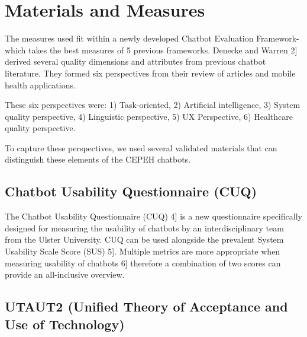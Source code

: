 \documentclass[a4paper, nobind]{templates/ociamthesis}
\begin{document}
\hypertarget{materials-and-measures}{%
\section{Materials and Measures}\label{materials-and-measures}}

The measures used fit within a newly developed Chatbot Evaluation Framework- which takes the best measures of 5 previous frameworks.
Denecke and Warren \hspace{0pt}{[}2{]}\hspace{0pt} derived several quality dimensions and attributes from previous chatbot literature.
They formed six perspectives from their review of articles and mobile health applications.

These six perspectives were: 1) Task-oriented, 2) Artificial intelligence, 3) System quality perspective, 4) Linguistic perspective, 5) UX Perspective, 6) Healthcare quality perspective.

To capture these perspectives, we used several validated materials that can distinguish these elements of the CEPEH chatbots.

\hypertarget{chatbot-usability-questionnaire-cuq}{%
\subsection{Chatbot Usability Questionnaire (CUQ)}\label{chatbot-usability-questionnaire-cuq}}

The Chatbot Usability Questionnaire (CUQ) \hspace{0pt}{[}4{]}\hspace{0pt} is a new questionnaire specifically designed for measuring the usability of chatbots by an interdisciplinary team from the Ulster University.
CUQ can be used alongside the prevalent System Usability Scale Score (SUS) \hspace{0pt}{[}5{]}\hspace{0pt}.
Multiple metrics are more appropriate when measuring usability of chatbots \hspace{0pt}{[}6{]}\hspace{0pt} therefore a combination of two scores can provide an all-inclusive overview.

\hypertarget{utaut2-unified-theory-of-acceptance-and-use-of-technology}{%
\subsection{UTAUT2 (Unified Theory of Acceptance and Use of Technology)}\label{utaut2-unified-theory-of-acceptance-and-use-of-technology}}
\end{document}

